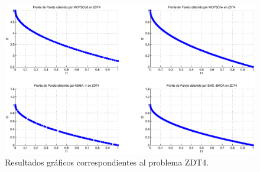  \clearpage
 \newpage
 \begin{figure}
      \begin{center}
	  \includegraphics[scale=0.45]{Cap4/rzdt4r.eps}
      \end{center}
	\caption{Resultados gr\'aficos correspondientes al problema ZDT4.}
      \label{fig:rZDT4}
      \end{figure}
 \clearpage
 \newpage
